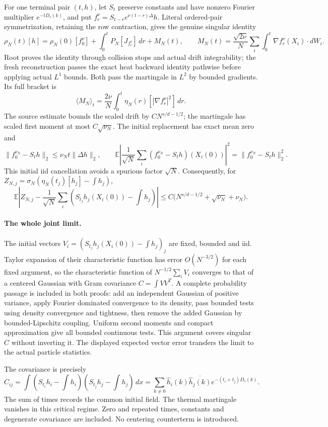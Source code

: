 \documentclass[10pt]{article}
\newcommand{\E}{\mathbb E}
\begin{document}
For one terminal pair $(t,h)$, let $S_t$ preserve constants and have nonzero Fourier multiplier $e^{-tD_s(k)}$, and put
$f_r^\nu=S_{t-r}e^{\nu(t-r)\Delta}h$.
Literal ordered-pair symmetrization, retaining the row contraction, gives the genuine singular identity
\[
 \rho_N(t)[h]=\rho_N(0)[f_0^\nu]+
 \int_0^tP_N[J_{f_r^\nu}]\,dr+M_N(t),
 \qquad
 M_N(t)=\frac{\sqrt{2\nu}}N\sum_i\int_0^t\nabla f_r^\nu(X_i)\cdot dW_i.
\]
Root proves the identity through collision stops and actual drift integrability; the fresh reconstruction passes the exact heat backward identity pathwise before applying actual $L^1$ bounds. Both pass the martingale in $L^2$ by bounded gradients. Its full bracket is
\[
 \langle M_N\rangle_t=\frac{2\nu}{N}\int_0^t\eta_N(r)[|\nabla f_r^\nu|^2]\,dr.
\]
The source estimate bounds the scaled drift by $C N^{s/d-1/2}$; the martingale has scaled first moment at most $C\sqrt{\nu_N}$. The initial replacement has exact mean zero and
\[
 \|f_0^{\nu_N}-S_th\|_2\le\nu_Nt\|\Delta h\|_2,
 \qquad
 \E\left|\frac1{\sqrt N}\sum_i(f_0^{\nu_N}-S_th)(X_i(0))\right|^2
 =\|f_0^{\nu_N}-S_th\|_2^2.
\]
This initial iid cancellation avoids a spurious factor $\sqrt N$. Consequently, for $Z_{N,j}=\sigma_N(\eta_N(t_j)[h_j]-\int h_j)$,
\[
 \boxed{\E\left|Z_{N,j}-\frac1{\sqrt N}\sum_i
 (S_{t_j}h_j(X_i(0))-\textstyle\int h_j)\right|
 \le C\big(N^{s/d-1/2}+\sqrt{\nu_N}+\nu_N\big).}
\]

\paragraph{The whole joint limit.}
The initial vectors $V_i=(S_{t_j}h_j(X_i(0))-\int h_j)_j$ are fixed, bounded and iid. Taylor expansion of their characteristic function has error $O(N^{-3/2})$ for each fixed argument, so the characteristic function of $N^{-1/2}\sum_iV_i$ converges to that of a centered Gaussian with Gram covariance $C=\int VV^T$.
A complete probability passage is included in both proofs: add an independent Gaussian of positive variance, apply Fourier dominated convergence to its density, pass bounded tests using density convergence and tightness, then remove the added Gaussian by bounded-Lipschitz coupling. Uniform second moments and compact approximation give all bounded continuous tests. This argument covers singular $C$ without inverting it. The displayed expected vector error transfers the limit to the actual particle statistics.

The covariance is precisely
\[
 C_{ij}=\int(S_{t_i}h_i-\textstyle\int h_i)(S_{t_j}h_j-\textstyle\int h_j)\,dx
 =\sum_{k\ne0}\widehat h_i(k)\overline{\widehat h_j(k)}e^{-(t_i+t_j)D_s(k)}.
\]
The sum of times records the common initial field. The thermal martingale vanishes in this critical regime. Zero and repeated times, constants and degenerate covariance are included. No centering counterterm is introduced.
\end{document}
